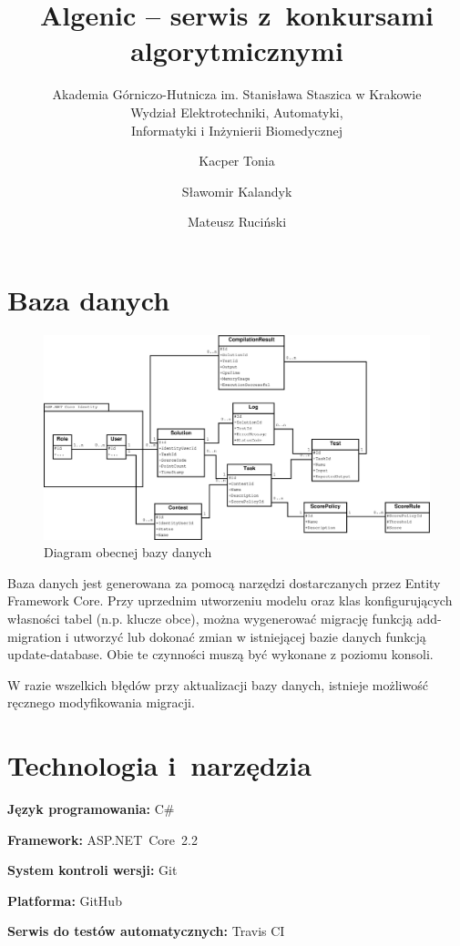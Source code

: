 \documentclass{article}
\title{Algenic -- serwis z~konkursami algorytmicznymi}
\subtitle{Akademia Górniczo-Hutnicza im. Stanisława Staszica w Krakowie\\
	Wydział Elektrotechniki, Automatyki,\\
	Informatyki i Inżynierii Biomedycznej}
\author{Kacper Tonia\and
		Sławomir Kalandyk\and
		Mateusz Ruciński}
\date{}
\begin{document}
\maketitle

\section{Baza danych}
\begin{figure}[H]
	\includegraphics[width=\linewidth]{entityDiagram.eps}
	\caption{Diagram obecnej bazy danych}
\end{figure}

Baza danych jest generowana za pomocą narzędzi dostarczanych przez Entity Framework Core. Przy uprzednim utworzeniu modelu oraz klas konfigurujących własności tabel (n.p. klucze obce), można wygenerować migrację funkcją add-migration i utworzyć lub dokonać zmian w istniejącej bazie danych funkcją update-database. Obie te czynności muszą być wykonane z poziomu konsoli. 

W razie wszelkich błędów przy aktualizacji bazy danych, istnieje możliwość ręcznego modyfikowania migracji.

\section{Technologia i~narzędzia}

\textbf{Język programowania:} C\#

\textbf{Framework:} ASP.NET~Core~2.2

\textbf{System kontroli wersji:} Git

\textbf{Platforma:} GitHub

\textbf{Serwis do testów automatycznych:} Travis CI
\end{document}
